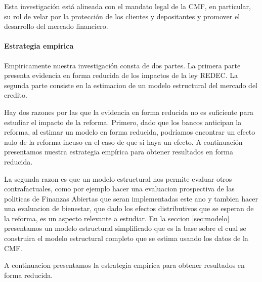 \documentclass[11pt]{article}
\theoremstyle{plain}
\theoremstyle{plain}
\begin{document}
Esta investigación está alineada con el mandato legal de la CMF, en particular, su rol de velar por la protección de los clientes y depositantes y promover el desarrollo del mercado financiero. 


 

\paragraph{Estrategia empirica}

Empiricamente nuestra investigación consta de dos partes. La primera parte presenta evidencia en forma reducida de los impactos de la ley REDEC. La segunda parte consiste en la estimacion de un modelo estructural del mercado del credito. 

Hay dos razones por las que la evidencia en forma reducida no es suficiente para estudiar el impacto de la reforma. Primero,  dado que los bancos anticipan la reforma, al estimar un modelo en forma reducida, podríamos encontrar un efecto nulo  de la reforma incuso en el caso de que si haya un efecto. A continuación presentamos nuestra estrategia empírica para obtener resultados en forma reducida. %


La segunda razon es que un modelo estructural nos permite evaluar otros contrafactuales, como por ejemplo hacer una evaluacion prospectiva de las politicas de Finanzas Abiertas que seran implementadas este ano y tambien hacer una evaluacion de bienestar, que dado los efectos distributivos que se esperan de la reforma, es un aspecto relevante a estudiar. En la seccion \ref{sec:modelo} presentamos un modelo estructural simplificado que es la base sobre el cual se construira el modelo estructural completo que se estima usando los datos de la CMF.

A continuacion presentamos la estrategia empirica para obtener resultados en forma reducida.
\end{document}
